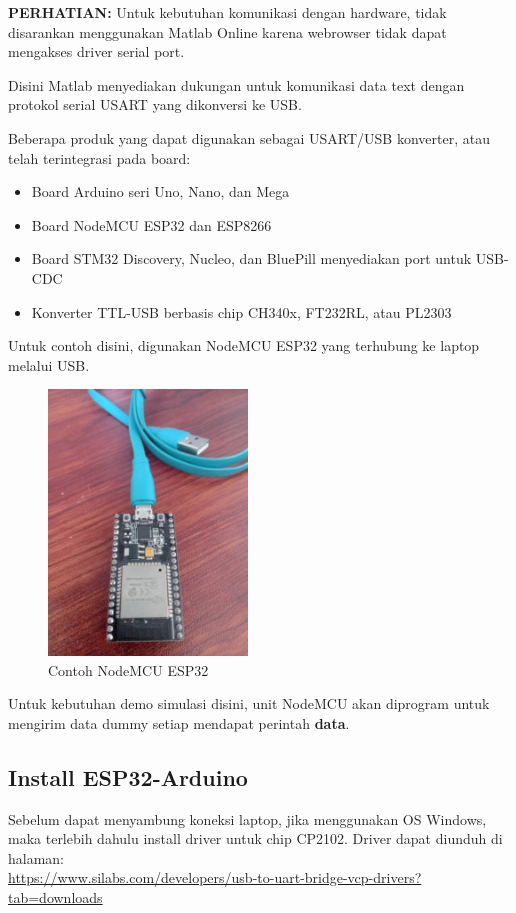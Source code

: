 \documentclass[12pt]{book}
\begin{document}
	\textbf{PERHATIAN:} Untuk kebutuhan komunikasi dengan hardware, tidak disarankan menggunakan Matlab Online
	karena webrowser tidak dapat mengakses driver serial port.

	Disini Matlab menyediakan dukungan untuk komunikasi data text dengan protokol serial USART yang dikonversi ke USB.
	
	Beberapa produk yang dapat digunakan sebagai USART/USB konverter, atau telah terintegrasi pada board:
	\begin{itemize}
		\item Board Arduino seri Uno, Nano, dan Mega 
		\item Board NodeMCU ESP32 dan ESP8266
		\item Board STM32 Discovery, Nucleo, dan BluePill menyediakan port untuk USB-CDC
		\item Konverter TTL-USB berbasis chip CH340x, FT232RL, atau PL2303
	\end{itemize}

	Untuk contoh disini, digunakan NodeMCU ESP32 yang terhubung ke laptop melalui USB.
	
	\begin{figure}[!ht]
		\centering
		\includegraphics[width=150pt]{images/esp32nodemcu}
		\caption{Contoh NodeMCU ESP32}
	\end{figure}

	Untuk kebutuhan demo simulasi disini, unit NodeMCU akan diprogram untuk mengirim data dummy setiap mendapat perintah \textbf{data}.
	
	\newpage	
	\subsection{Install ESP32-Arduino}
	Sebelum dapat menyambung koneksi laptop, jika menggunakan OS Windows, maka terlebih dahulu install driver untuk chip CP2102.
	Driver dapat diunduh di halaman:\\
	\url{https://www.silabs.com/developers/usb-to-uart-bridge-vcp-drivers?tab=downloads}\\
	
\end{document}
